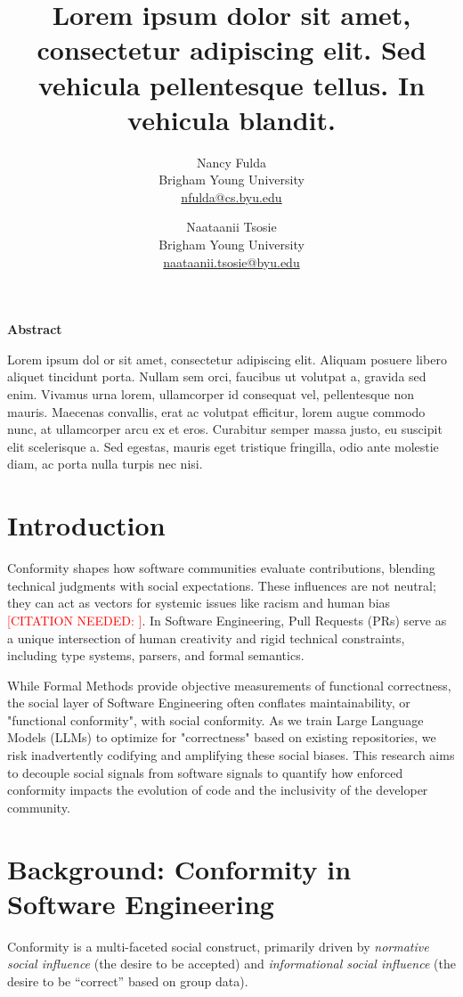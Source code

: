 \documentclass[10pt]{article}
\title{Lorem ipsum dolor sit amet, consectetur adipiscing elit. Sed vehicula pellentesque tellus. In vehicula blandit.}
\author{%
    Nancy Fulda\\
    Brigham Young University\\
    \href{mailto:nfulda@cs.byu.edu}{nfulda@cs.byu.edu}
    \and
    Naataanii Tsosie\\
    Brigham Young University\\
    \href{mailto:naataanii.tsosie@byu.edu}{naataanii.tsosie@byu.edu}
}
\newcommand{\needcite}[1]{\textcolor{red}{[CITATION NEEDED: #1]}}
\begin{document}
\date{}

\maketitle
\renewenvironment{abstract}{%
    \small
    \begin{center}
        {\bfseries Abstract} %
    \end{center}
    \quotation %
    \itshape
}{%
    \endquotation
}
\begin{abstract}
Lorem ipsum dol or sit amet, consectetur adipiscing elit. Aliquam posuere libero aliquet tincidunt porta. Nullam sem orci, faucibus ut volutpat a, gravida sed enim. Vivamus urna lorem, ullamcorper id consequat vel, pellentesque non mauris. Maecenas convallis, erat ac volutpat efficitur, lorem augue commodo nunc, at ullamcorper arcu ex et eros. Curabitur semper massa justo, eu suscipit elit scelerisque a. Sed egestas, mauris eget tristique fringilla, odio ante molestie diam, ac porta nulla turpis nec nisi.
\end{abstract}

\section{Introduction}
Conformity shapes how software communities evaluate contributions, blending technical judgments with social expectations. These influences are not neutral; they can act as vectors for systemic issues like racism and human bias \needcite{}. In Software Engineering, Pull Requests (PRs) serve as a unique intersection of human creativity and rigid technical constraints, including type systems, parsers, and formal semantics.

While Formal Methods provide objective measurements of functional correctness, the social layer of Software Engineering often conflates maintainability, or "functional conformity", with social conformity. As we train Large Language Models (LLMs) to optimize for "correctness" based on existing repositories, we risk inadvertently codifying and amplifying these social biases. This research aims to decouple social signals from software signals to quantify how enforced conformity impacts the evolution of code and the inclusivity of the developer community.

\section{Background: Conformity in Software Engineering}
Conformity is a multi-faceted social construct, primarily driven by \emph{normative social influence} (the desire to be accepted) and \emph{informational social influence} (the desire to be ``correct'' based on group data)\cite{deutsch1955study}.
\end{document}
